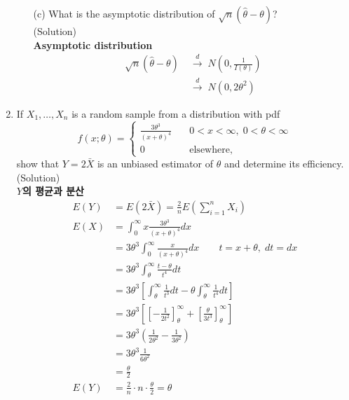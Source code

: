 \documentclass{oblivoir}
\newcommand{\flr}[1]{\left ( #1 \right )}
\newcommand{\tlr}[1]{\left [ #1 \right]}
\newcommand{\blue}[1]{{\color{blue} #1}}
\begin{document}
\begin{enumerate}
\begin{enumerate}
\vspace{3mm}
\item[(c)]
What is the asymptotic distribution of $\sqrt{n} (\hat\theta - \theta)$? \\
\blue{(Solution)} \\
\textbf{Asymptotic distribution}
\begin{align*}
\sqrt{n} (\hat\theta - \theta) \; &\overset{d}{\longrightarrow} \; N\flr{0, \frac{1}{I(\theta)}} \\
&\overset{d}{\longrightarrow} \; N\flr{0, 2\theta^2}
\end{align*}
\end{enumerate}

\vspace{5mm}
\item 
If $X_1, \ldots, X_n$ is a random sample from a distribution with pdf
$$
f(x;\theta) =
\begin{cases}
\frac{3 \theta^3}{(x+\theta)^4} \quad & 0 < x < \infty, \; 0 < \theta < \infty \\
0 & \mbox{elsewhere},
\end{cases}
$$
show that $Y = 2 \bar{X}$ is an unbiased estimator of $\theta$ and determine its efficiency. \\
\blue{(Solution)} \\
\textbf{$Y$의 평균과 분산} 
\begin{align*}
E(Y) &= E(2\bar{X}) = \frac{2}{n} E(\sum_{i=1}^n X_i)\\
E(X) &= \int_0^{\infty} x \frac{3 \theta^3}{(x+\theta)^4} dx \\
&= 3\theta^3 \int_0^{\infty} \frac{x}{(x+\theta)^4} dx \qquad t = x+\theta, \; dt = dx \\
&= 3\theta^3 \int_{\theta}^{\infty} \frac{t - \theta}{t^4} dt \\
&= 3\theta^3 \tlr{\int_{\theta}^{\infty} \frac{1}{t^3} dt -\theta \int_{\theta}^{\infty} \frac{1}{t^4} dt} \\
&= 3\theta^3 \tlr{\tlr{- \frac{1}{2t^2}}_{\theta}^{\infty} + \tlr{\frac{\theta}{3t^3}}_{\theta}^{\infty}} \\
&= 3\theta^3 \flr{\frac{1}{2\theta^2} - \frac{1}{3\theta^2}} \\
&= 3\theta^3 \frac{1}{6\theta^2} \\
&= \frac{\theta}{2}\\
E(Y) &= \frac{2}{n}\cdot n \cdot\frac{\theta}{2} = \theta

\end{align*}
\end{enumerate}
\end{document}
